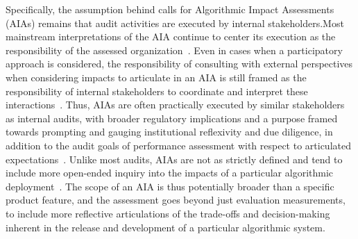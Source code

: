 \documentclass[sigconf]{acmart}
\begin{document}
Specifically, the assumption behind calls for Algorithmic Impact Assessments (AIAs) remains that audit activities are executed by internal stakeholders.Most mainstream interpretations of the AIA continue to center its execution as the responsibility of the assessed organization~\cite{reisman2018algorithmic,selbst2021institutional}. Even in cases when a participatory approach is considered, the responsibility of consulting with external perspectives when considering impacts to articulate in an AIA is still framed as the responsibility of internal stakeholders to coordinate and interpret these interactions~\cite{metcalf2021algorithmic}. Thus, AIAs are often practically executed by similar stakeholders as internal audits, with broader regulatory implications and a purpose framed towards prompting and gauging institutional reflexivity and due diligence, in addition to the audit goals of performance assessment with respect to articulated expectations~\cite{lovelace2020examining}. Unlike most audits, AIAs are not as strictly defined and tend to include more open-ended inquiry into the impacts of a particular algorithmic deployment~\cite{moss2021assembling}. The scope of an AIA is thus potentially broader than a specific product feature, and the assessment goes beyond just evaluation measurements, to include more reflective articulations of the trade-offs and decision-making inherent in the release and development of a particular algorithmic system. 
\end{document}
